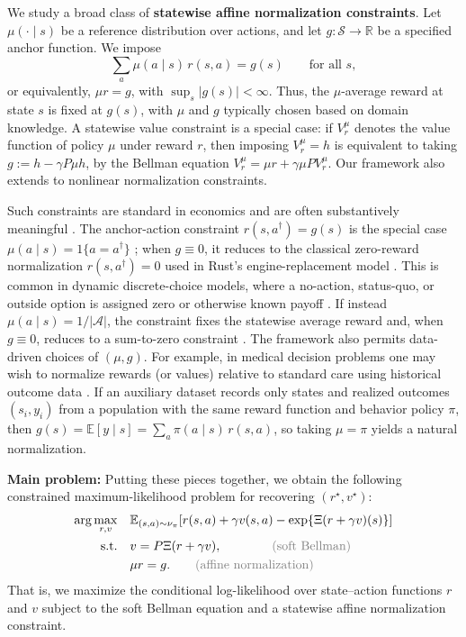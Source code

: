 \documentclass{article}
\newcommand{\E}{\mathbb{E}}
\newcommand{\1}{\mathbbm{1}}
\begin{document}
We study a broad class of \textbf{statewise affine normalization
constraints}. Let \(\mu(\cdot \mid s)\) be a reference distribution over
actions, and let \(g:\mathcal S\to\mathbb R\) be a specified anchor function.
We impose
\begin{equation}
\sum_a \mu(a \mid s)\,r(s,a)=g(s)
\qquad \text{for all } s,
\end{equation}
or equivalently, \(\mu r=g\), with \(\sup_s |g(s)|<\infty\). Thus, the
\(\mu\)-average reward at state \(s\) is fixed at \(g(s)\), with \(\mu\) and
\(g\) typically chosen based on domain knowledge. A statewise value constraint is a special case: if \(V_r^\mu\) denotes the
value function of policy \(\mu\) under reward \(r\), then imposing
\(V_r^\mu=h\) is equivalent to taking \(g:=h-\gamma P\mu h\), by the Bellman
equation \(V_r^\mu=\mu r+\gamma \mu P V_r^\mu\). Our framework also extends to nonlinear normalization constraints.


Such constraints are standard in economics and are often substantively
meaningful \citep{hotz1993conditional,bajari2010identification}. The
anchor-action constraint \(r(s,a^\dagger)=g(s)\) is the special case
\(\mu(a \mid s)=1\{a=a^\dagger\}\) \citep{geng2020deep}; when \(g \equiv 0\),
it reduces to the classical zero-reward normalization \(r(s,a^\dagger)=0\)
used in Rust's engine-replacement model \citep{rust1987optimal}. This is
common in dynamic discrete-choice models, where a no-action, status-quo, or
outside option is assigned zero or otherwise known payoff
\citep{rust1987optimal,hotz1993conditional,aguirregabiria2010dynamic,geng2020deep}.
If instead \(\mu(a \mid s)=1/|\mathcal A|\), the constraint fixes the
statewise average reward and, when \(g \equiv 0\), reduces to a sum-to-zero
constraint \citep{kallus2016revealed}. The framework also permits data-driven
choices of \((\mu,g)\). For example, in medical decision problems one may wish
to normalize rewards (or values) relative to standard care using historical
outcome data \citep{kallus2018removing}. If an auxiliary dataset records only
states and realized outcomes \((s_i,y_i)\) from a population with the same
reward function and behavior policy \(\pi\), then
\(g(s)=\mathbb E[y\mid s]=\sum_a \pi(a\mid s)\,r(s,a)\), so taking \(\mu=\pi\)
yields a natural normalization.



 
\textbf{Main problem:} Putting these pieces together, we obtain the following
constrained maximum-likelihood problem for recovering \((r^\star, v^\star)\):
\begin{equation}
\label{eq:main-irl}
\begin{aligned}
\arg\max_{r,v}\quad
& \E_{(s,a) \sim \nu_{\pi}}\!\left[
  r(s,a) + \gamma v(s,a) - \exp\{\Xi(r+\gamma v)(s)\}
\right] \\
\text{s.t.}\quad
& v = P\Xi(r+\gamma v), \qquad\qquad\text{\color{gray}(soft Bellman)} \\
& \mu r = g.
\qquad\text{\color{gray}(affine normalization)}
\end{aligned}
\end{equation}
That is, we maximize the conditional log-likelihood over state--action
functions \(r\) and \(v\) subject to the soft Bellman equation and a statewise
affine normalization constraint.
\end{document}
